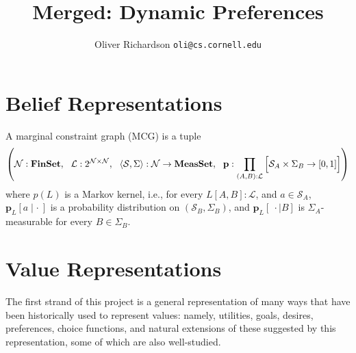 \documentclass{article}
\title{Merged: Dynamic Preferences}
\author{Oliver Richardson  \texttt{oli@cs.cornell.edu}}
\begin{document}
	\maketitle
	
	
%	


	
	\part{Belief Representations}
	
	\begin{defn}\label{def:mcg}
		A marginal constraint graph (MCG) is a tuple 
		\[ \left(\mathcal N : \mathbf{FinSet},~~\mathcal L : 2^{\cal N \times N},~~ \langle\mathcal S, \Sigma\rangle : \mathcal N \to \mathbf{MeasSet}, ~~\mathbf p : \prod_{(A,B): \mathcal L} \left[ \Big. \mathcal S_A \times \Sigma_B \to [0,1]\right] \right) \]
		where $p(L)$ is a Markov kernel, i.e., for every $L[A,B] : \mathcal L$, and $a \in \mathcal S_A$, $\mathbf p_L[a \mid \cdot~]$ is a probability distribution on $(\mathcal S_B, \Sigma_B)$, and $\mathbf p_L[~\cdot \mid B]$ is $\Sigma_A$-measurable for every $B \in \Sigma_B$.
	\end{defn}

	\part{Value Representations}
	
	The first strand of this project is a general representation of many ways that have been historically used to represent values: namely, utilities, goals, desires, preferences, choice functions, and natural extensions of these suggested by this representation, some of which are also well-studied. 
	
\end{document}
